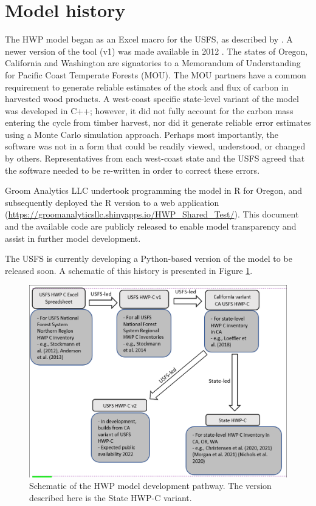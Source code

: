 \documentclass[
]{book}
\begin{document}
\hypertarget{int-hist}{%
\section{Model history}\label{int-hist}}

The HWP model began as an Excel macro for the USFS, as described by \citet{stockmann2012}. A newer version of the tool (v1) was made available in 2012 \citep{loeffler2014}. The states of Oregon, California and Washington are signatories to a Memorandum of Understanding for Pacific Coast Temperate Forests (MOU). The MOU partners have a common requirement to generate reliable estimates of the stock and flux of carbon in harvested wood products. A west-coast specific state-level variant of the model was developed in C++; however, it did not fully account for the carbon mass entering the cycle from timber harvest, nor did it generate reliable error estimates using a Monte Carlo simulation approach. Perhaps most importantly, the software was not in a form that could be readily viewed, understood, or changed by others. Representatives from each west-coast state and the USFS agreed that the software needed to be re-written in order to correct these errors.

Groom Analytics LLC undertook programming the \citet{stockmann2012} model in R for Oregon, and subsequently deployed the R version to a web application (\url{https://groomanalyticsllc.shinyapps.io/HWP_Shared_Test/}). This document and the available code are publicly released to enable model transparency and assist in further model development.

The USFS is currently developing a Python-based version of the model to be released soon. A schematic of this history is presented in Figure \ref{fig:hist-fig}.

\begin{figure}
\includegraphics[width=1\linewidth]{images/ModelHistory} \caption{Schematic of the HWP model development pathway.  The version described here is the State HWP-C variant.}\label{fig:hist-fig}
\end{figure}
\end{document}
